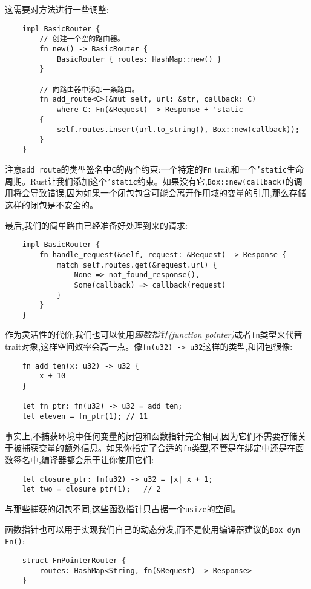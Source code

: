这需要对方法进行一些调整:
\begin{verbatim}
    impl BasicRouter {
        // 创建一个空的路由器。
        fn new() -> BasicRouter {
            BasicRouter { routes: HashMap::new() }
        }

        // 向路由器中添加一条路由。
        fn add_route<C>(&mut self, url: &str, callback: C)
            where C: Fn(&Request) -> Response + 'static
        {
            self.routes.insert(url.to_string(), Box::new(callback));
        }
    }
\end{verbatim}

\begin{note}
    注意\texttt{add\_route}的类型签名中\texttt{C}的两个约束:一个特定的\texttt{Fn} trait和一个\texttt{'static}生命周期。Rust让我们添加这个\texttt{'static}约束。如果没有它,\texttt{Box::new(callback)}的调用将会导致错误,因为如果一个闭包包含可能会离开作用域的变量的引用,那么存储这样的闭包是不安全的。
\end{note}

最后,我们的简单路由已经准备好处理到来的请求:
\begin{verbatim}
    impl BasicRouter {
        fn handle_request(&self, request: &Request) -> Response {
            match self.routes.get(&request.url) {
                None => not_found_response(),
                Some(callback) => callback(request)
            }
        }
    }
\end{verbatim}

作为灵活性的代价,我们也可以使用\emph{函数指针(function pointer)}或者\texttt{fn}类型来代替trait对象,这样空间效率会高一点。像\texttt{fn(u32) -> u32}这样的类型,和闭包很像:
\begin{verbatim}
    fn add_ten(x: u32) -> u32 {
        x + 10
    }

    let fn_ptr: fn(u32) -> u32 = add_ten;
    let eleven = fn_ptr(1); // 11
\end{verbatim}

事实上,不捕获环境中任何变量的闭包和函数指针完全相同,因为它们不需要存储关于被捕获变量的额外信息。如果你指定了合适的\texttt{fn}类型,不管是在绑定中还是在函数签名中,编译器都会乐于让你使用它们:
\begin{verbatim}
    let closure_ptr: fn(u32) -> u32 = |x| x + 1;
    let two = closure_ptr(1);   // 2
\end{verbatim}

与那些捕获的闭包不同,这些函数指针只占据一个\texttt{usize}的空间。

函数指针也可以用于实现我们自己的动态分发,而不是使用编译器建议的\texttt{Box dyn Fn()}:
\begin{verbatim}
    struct FnPointerRouter {
        routes: HashMap<String, fn(&Request) -> Response>
    }
\end{verbatim}


